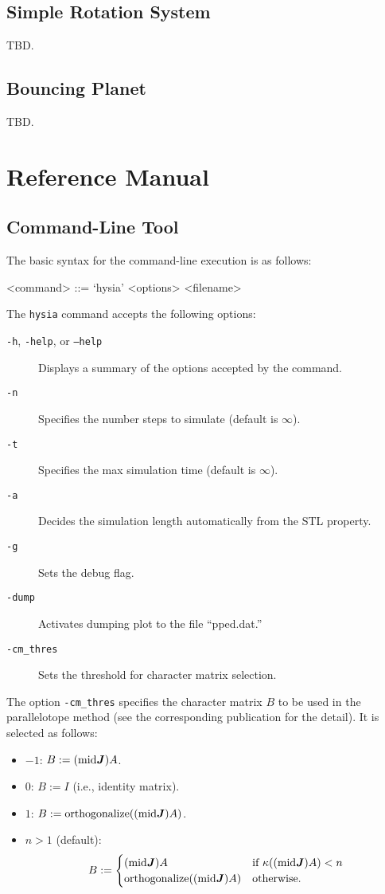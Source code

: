 \documentclass[12pt,a4paper]{article}
\begin{document}
\subsection{Simple Rotation System}

TBD.

\subsection{Bouncing Planet}

TBD.


\section{Reference Manual}

\subsection{Command-Line Tool}

The basic syntax for the command-line execution is as follows:
\begin{grammar}
<command> ::= `hysia' <options> <filename>
\end{grammar}
%
The \texttt{hysia} command accepts the following options:
\begin{description}
\item[\texttt{-h}, \texttt{-help}, or \texttt{--help}] Displays a summary of the options accepted by the command.
\item[\texttt{-n}] Specifies the number steps to simulate (default is $\infty$).
\item[\texttt{-t}] Specifies the max simulation time (default is $\infty$).
\item[\texttt{-a}] Decides the simulation length automatically from the STL property.
\item[\texttt{-g}] Sets the debug flag.
\item[\texttt{-dump}] Activates dumping plot to the file ``pped.dat.''
\item[\texttt{-cm_thres}] Sets the threshold for character matrix selection.
\end{description}

The option \texttt{-cm_thres} specifies the character matrix $B$ to be used in the parallelotope method (see the corresponding publication for the detail). It is selected as follows:
\begin{itemize}
	\item $-1$: $B := (\mathrm{mid}\J) A$.
	\item $0$: $B := I$ (i.e., identity matrix).
	\item $1$: $B := \mathrm{orthogonalize}((\mathrm{mid}\J) A)$.
	\item $n > 1$ (default): 
		\[
			B := \begin{cases}
				(\mathrm{mid}\J) A & \text{if $\kappa((\mathrm{mid}\J) A) < n$} \\
				\mathrm{orthogonalize}((\mathrm{mid}\J) A) & \text{otherwise.}
			\end{cases}
		\]
\end{itemize}
\end{document}
